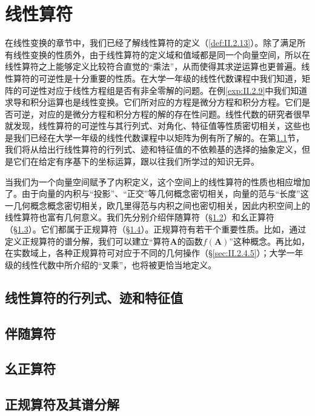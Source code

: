 \documentclass[zihao=-4,linespread=1.5,a4paper,heading=true,twoside]{ctexbook}
\theoremstyle{definition}
\theoremstyle{plain}
\begin{document}
\section{线性算符}\label{sec:II.2.4}
在线性变换的章节中，我们已经了解线性算符的定义（\ref{def:II.2.13}）。除了满足所有线性变换的性质外，由于线性算符的定义域和值域都是同一个向量空间，所以在线性算符之上能够定义比较符合直觉的“乘法”，从而使得其求逆运算也更普遍。线性算符的可逆性是十分重要的性质。在大学一年级的线性代数课程中我们知道，矩阵的可逆性对应于线性方程组是否有非全零解的问题。在例\ref{exp:II.2.9}中我们知道求导和积分运算也是线性变换。它们所对应的方程是微分方程和积分方程。它们是否可逆，对应的是微分方程和积分方程的解的存在性问题。线性代数的研究者很早就发现，线性算符的可逆性与其行列式、对角化、特征值等性质密切相关，这些也是我们已经在大学一年级的线性代数课程中以矩阵为例有所了解的。在第\ref{sec:II.2.4.1}节，我们将从给出行线性算符的行列式、迹和特征值的不依赖基的选择的抽象定义，但是它们在给定有序基下的坐标运算，跟以往我们所学过的知识无异。

当我们为一个向量空间赋予了内积定义，这个空间上的线性算符的性质也相应增加了。由于向量的内积与“投影”、“正交”等几何概念密切相关，向量的范与“长度”这一几何概念概念密切相关，欧几里得范与内积之间也密切相关，因此内积空间上的线性算符也富有几何意义。我们先分别介绍伴随算符（\S \ref{sec:II.2.4.2}）和幺正算符（\S \ref{sec:II.2.4.3}）。它们都属于正规算符（\S \ref{sec:II.2.4.4}）。正规算符有若干个重要性质。比如，通过定义正规算符的谱分解，我们可以建立“算符$\mathbf{A}$的函数$f\left(\mathbf{A}\right)$”这种概念。再比如，在实数域上，各种正规算符可对应于不同的几何操作（\S \ref{sec:II.2.4.5}）；大学一年级的线性代数中所介绍的“叉乘”，也将被更恰当地定义。

\subsection{线性算符的行列式、迹和特征值}\label{sec:II.2.4.1}

\subsection{伴随算符}\label{sec:II.2.4.2}

\subsection{幺正算符}\label{sec:II.2.4.3}

\subsection{正规算符及其谱分解}\label{sec:II.2.4.4}

\end{document}
